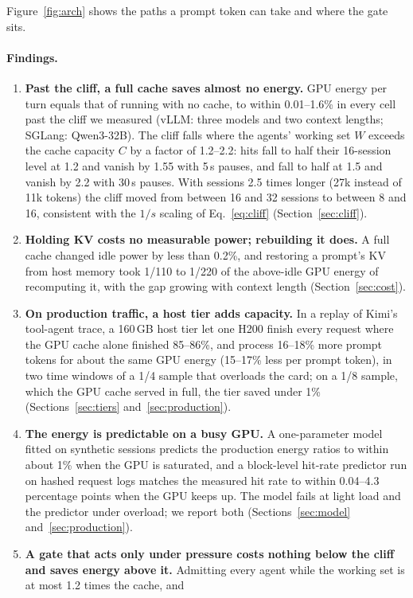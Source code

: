 Figure~\ref{fig:arch} shows the paths a prompt token can take and where the gate sits.



\paragraph{Findings.}
\begin{enumerate}
\item \textbf{Past the cliff, a full cache saves almost no energy.} GPU energy per turn equals that of running with no cache,
to within 0.01--1.6\% in every cell past the cliff we measured (vLLM: three models and two context lengths; SGLang: Qwen3-32B). The cliff falls where the agents'
working set $W$ exceeds the cache capacity $C$ by a factor of 1.2--2.2: hits fall to half their 16-session level at 1.2 and vanish by 1.55 with 5\,s pauses, and fall to
half at 1.5 and vanish by 2.2 with 30\,s pauses. With sessions 2.5 times longer (27k instead of 11k tokens) the cliff moved from between 16 and 32 sessions to between 8 and 16, consistent with the $1/s$ scaling of Eq.~\eqref{eq:cliff} (Section~\ref{sec:cliff}).
\item \textbf{Holding KV costs no measurable power; rebuilding it does.} A full cache changed idle power by less than
0.2\%, and restoring a prompt's KV from host memory took 1/110 to 1/220 of the above-idle GPU energy of recomputing it,
with the gap growing with context length (Section~\ref{sec:cost}).
\item \textbf{On production traffic, a host tier adds capacity.} In a replay of Kimi's tool-agent trace, a 160\,GB host
tier let one H200 finish every request where the GPU cache alone finished 85--86\%, and process 16--18\% more prompt tokens
for about the same GPU energy (15--17\% less per prompt token), in two time windows of a 1/4 sample that overloads the
card; on a 1/8 sample, which the GPU cache served in full, the tier saved under 1\% (Sections~\ref{sec:tiers}
and~\ref{sec:production}).
\item \textbf{The energy is predictable on a busy GPU.} A one-parameter model fitted on synthetic sessions predicts the
production energy ratios to within about 1\% when the GPU is saturated, and a block-level hit-rate predictor run on
hashed request logs matches the measured hit rate to within 0.04--4.3 percentage points when the GPU keeps up. The model fails at
light load and the predictor under overload; we report both (Sections~\ref{sec:model} and~\ref{sec:production}).
\item \textbf{A gate that acts only under pressure costs nothing below the cliff and saves energy above it.} Admitting every agent while the working set is at most 1.2 times the cache, and

\end{enumerate}
